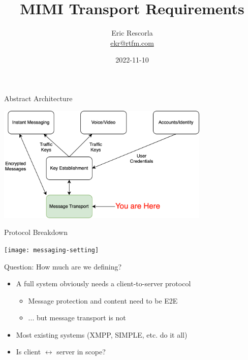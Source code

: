 \documentclass[helvetica]{beamer}
\title{MIMI Transport Requirements}
\author{Eric Rescorla \\\url{ekr@rtfm.com}}
\date{2022-11-10}
\begin{document}
\begin{frame}
  \titlepage
\end{frame}

\begin{frame}{Abstract Architecture}

  \vspace{.2in}
\begin{center}
  \includegraphics[width=4in]{messaging-architecture}
\end{center}
\end{frame}


\begin{frame}{Protocol Breakdown}

  \vspace{.2in}
\begin{center}
  \texttt{[image: messaging-setting]}
\end{center}
\end{frame}

\begin{frame}{Question: How much are we defining?}

  \begin{itemize}
  \item A full system obviously needs a client-to-server protocol
    \begin{itemize}
    \item Message protection and content need to be E2E
    \item ... but message transport is not      
    \end{itemize}
  \item Most existing systems (XMPP, SIMPLE, etc. do it all)
  \item Is client $\longleftrightarrow$ server in scope?
  \end{itemize}  
\end{frame}
\end{document}
